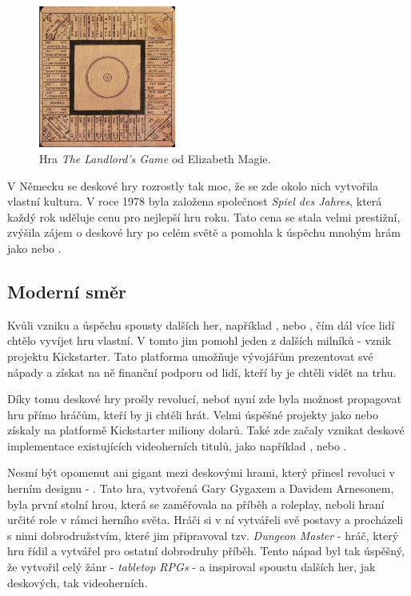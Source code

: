 \begin{figure}[h]
    \centering
    \includegraphics[width=0.4\textwidth]{figures/images/landlords-game.png}
    \caption{Hra \textit{The Landlord's Game} od Elizabeth Magie. \cite{attia_2018}}
    \label{fig:landlords-game}
\end{figure}

V Německu se deskové hry rozrostly tak moc, že se zde okolo nich vytvořila vlastní kultura. V roce 1978 byla založena společnost \textit{Spiel des Jahres}, která každý rok uděluje cenu pro nejlepší hru roku. Tato cena se stala velmi prestižní, zvýšila zájem o deskové hry po celém světě a pomohla k úspěchu mnohým hrám jako  nebo . \cite{attia_2018}

\subsection{Moderní směr}
\label{subsec:modern}

Kvůli vzniku a úspěchu spousty dalších her, například ,  nebo , čím dál více lidí chtělo vyvíjet hru vlastní. V tomto jim pomohl jeden z dalších milníků - vznik projektu Kickstarter. Tato platforma umožňuje vývojářům prezentovat své nápady a získat na ně finanční podporu od lidí, kteří by je chtěli vidět na trhu. \cite{attia_2018}

Díky tomu deskové hry prošly revolucí, neboť nyní zde byla možnost propagovat hru přímo hráčům, kteří by ji chtěli hrát. Velmi úspěšné projekty jako  nebo  získaly na platformě Kickstarter miliony dolarů. Také zde začaly vznikat deskové implementace existujících videoherních titulů, jako například ,  nebo . \cite{kickstarter}

Nesmí být opomenut ani gigant mezi deskovými hrami, který přinesl revoluci v herním designu - \textbf{}. Tato hra, vytvořená Gary Gygaxem a Davidem Arnesonem, byla první stolní hrou, která se zaměřovala na příběh a roleplay, neboli hraní určité role v rámci herního světa. Hráči si v ní vytvářeli své postavy a procházeli s nimi dobrodružstvím, které jim připravoval tzv. \textit{Dungeon Master} - hráč, který hru řídil a vytvářel pro ostatní dobrodruhy příběh. Tento nápad byl tak úspěšný, že vytvořil celý žánr - \textit{tabletop RPGs} - a inspiroval spoustu dalších her, jak deskových, tak videoherních. \cite{dnd_beyond_2023}

